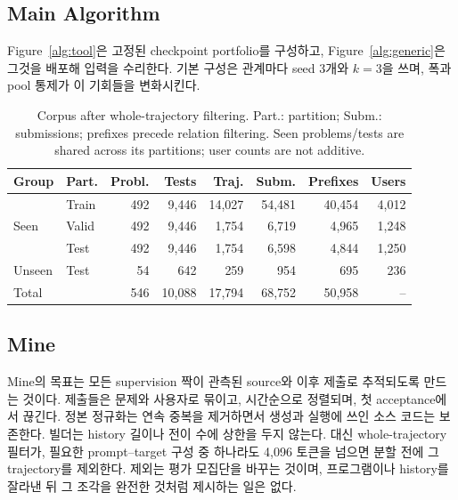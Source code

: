 \documentclass[10pt,conference]{IEEEtran}
\begin{document}
\subsection{Main Algorithm}

Figure~\ref{alg:tool}은 고정된 checkpoint portfolio를 구성하고, Figure~\ref{alg:generic}은 그것을 배포해 입력을 수리한다. 기본 구성은 관계마다 seed 3개와 \(k=3\)을 쓰며, 폭과 pool 통제가 이 기회들을 변화시킨다.

\begin{table}[t]
\caption{Corpus after whole-trajectory filtering. Part.: partition; Subm.: submissions; prefixes precede relation filtering. Seen problems/tests are shared across its partitions; user counts are not additive.}
\label{tab:data}
\centering\scriptsize\setlength{\tabcolsep}{2.5pt}
\begin{tabular}{ll||rrrrrr}
\toprule
Group & Part. & Probl. & Tests & Traj. & Subm. & Prefixes & Users \\
\midrule
\multirow{3}{*}{Seen} & Train & 492 & 9,446 & 14,027 & 54,481 & 40,454 & 4,012 \\
 & Valid & 492 & 9,446 & 1,754 & 6,719 & 4,965 & 1,248 \\
 & Test & 492 & 9,446 & 1,754 & 6,598 & 4,844 & 1,250 \\
Unseen & Test & 54 & 642 & 259 & 954 & 695 & 236 \\
\midrule
Total & & 546 & 10,088 & 17,794 & 68,752 & 50,958 & -- \\
\bottomrule
\end{tabular}
\end{table}

\subsection{Mine}
Mine의 목표는 모든 supervision 짝이 관측된 source와 이후 제출로 추적되도록 만드는 것이다. 제출들은 문제와 사용자로 묶이고, 시간순으로 정렬되며, 첫 acceptance에서 끊긴다. 정본 정규화는 연속 중복을 제거하면서 생성과 실행에 쓰인 소스 코드는 보존한다. 빌더는 history 길이나 전이 수에 상한을 두지 않는다. 대신 whole-trajectory 필터가, 필요한 prompt--target 구성 중 하나라도 4,096 토큰을 넘으면 분할 전에 그 trajectory를 제외한다. 제외는 평가 모집단을 바꾸는 것이며, 프로그램이나 history를 잘라낸 뒤 그 조각을 완전한 것처럼 제시하는 일은 없다.
\end{document}
